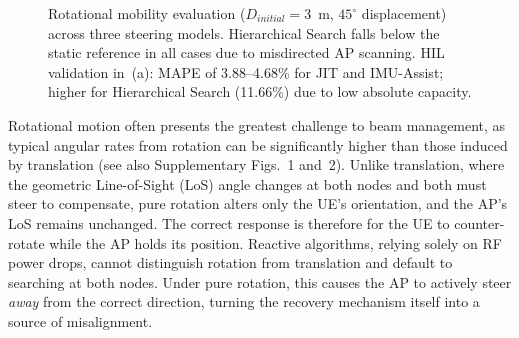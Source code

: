 \documentclass[fleqn,10pt]{wlscirep}
\newcommand{\legline}[2]{%
    \tikz[baseline=-0.5ex]{
        \draw[#1, #2, line width=1.5pt] (0,0) -- (0.5,0);
    }%
}
\newcommand{\legmark}[2]{%
    \tikz[baseline=-0.5ex]{
        \node[#2, fill=#1, draw=#1, inner sep=2pt, scale=0.8] at (0,0) {};
    }%
}
\begin{document}
\begin{figure}[ht!]
    \caption{Rotational mobility evaluation ($D_{initial} = 3$~m, $45^\circ$ displacement) across three steering models. Hierarchical Search falls below the static reference in all cases due to misdirected AP scanning. HIL validation in~(a): MAPE of 3.88--4.68\% for JIT and IMU-Assist; higher for Hierarchical Search (11.66\%) due to low absolute capacity.}
    \label{fig:rotational_rate}
    \vspace{-5pt}
\end{figure}

Rotational motion often presents the greatest challenge to beam management, as typical angular rates from rotation can be significantly higher than those induced by translation\cite{9391649} (see also Supplementary Figs.~1 and~2). Unlike translation, where the geometric Line-of-Sight (LoS) angle changes at both nodes and both must steer to compensate, pure rotation alters only the UE's orientation, and the AP's LoS remains unchanged. The correct response is therefore for the UE to counter-rotate while the AP holds its position. Reactive algorithms, relying solely on RF power drops, cannot distinguish rotation from translation and default to searching at both nodes. Under pure rotation, this causes the AP to actively steer \emph{away} from the correct direction, turning the recovery mechanism itself into a source of misalignment.
\end{document}
